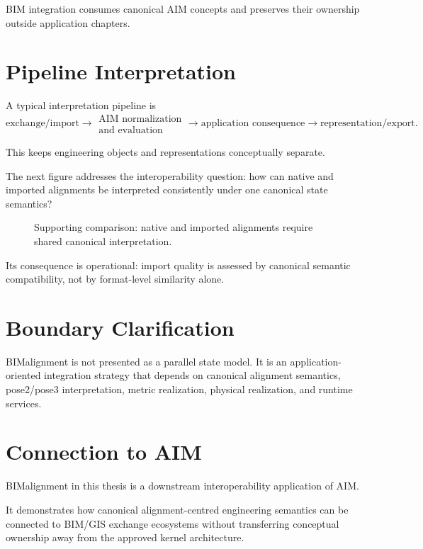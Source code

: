 \begin{principle}
BIM integration consumes canonical AIM concepts and preserves their
ownership outside application chapters.
\end{principle}

\section{Pipeline Interpretation}

A typical interpretation pipeline is
\[
\text{exchange/import}
\rightarrow
\substack{\text{AIM normalization}\\\text{and evaluation}}
\rightarrow
\text{application consequence}
\rightarrow
\text{representation/export}.
\]

This keeps engineering objects and representations conceptually
separate.

The next figure addresses the interoperability question: how can native
and imported alignments be interpreted consistently under one canonical
state semantics?

\begin{figure}[ht]
\centering

\caption{Supporting comparison: native and imported alignments require shared canonical interpretation.}
\label{fig:support-native-vs-imported}
\end{figure}

Its consequence is operational: import quality is assessed by canonical
semantic compatibility, not by format-level similarity alone.

\section{Boundary Clarification}

BIMalignment is not presented as a parallel state model. It is an
application-oriented integration strategy that depends on canonical
alignment semantics, pose2/pose3 interpretation, metric realization,
physical realization, and runtime services.

\section{Connection to AIM}

\begin{summary}
BIMalignment in this thesis is a downstream interoperability application
of AIM.

It demonstrates how canonical alignment-centred engineering semantics
can be connected to BIM/GIS exchange ecosystems without transferring
conceptual ownership away from the approved kernel architecture.
\end{summary}
